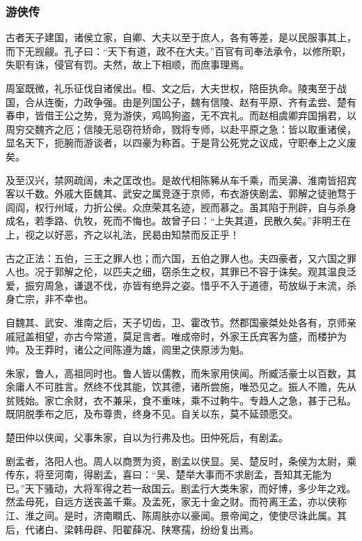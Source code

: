 \documentclass[]{article}
\begin{document}
\hypertarget{header-n6087}{%
\subsubsection{游侠传}\label{header-n6087}}

古者天子建国，诸侯立家，自卿、大夫以至于庶人，各有等差，是以民服事其上，而下无觊觎。孔子曰：``天下有道，政不在大夫。''百官有司奉法承令，以修所职，失职有诛，侵官有罚。夫然，故上下相顺，而庶事理焉。

周室既微，礼乐征伐自诸侯出。桓、文之后，大夫世权，陪臣执命。陵夷至于战国，合从连衡，力政争强。由是列国公子，魏有信陵、赵有平原、齐有孟尝、楚有春申，皆借王公之势，竞为游侠，鸡鸣狗盗，无不宾礼。而赵相虞卿弃国捐君，以周穷交魏齐之厄；信陵无忌窃符矫命，戮将专师，以赴平原之急：皆以取重诸侯，显名天下，扼腕而游谈者，以四豪为称首。于是背公死党之议成，守职奉上之义废矣。

及至汉兴，禁网疏阔，未之匡改也。是故代相陈豨从车千乘，而吴濞、淮南皆招宾客以千数。外戚大臣魏其、武安之属竞逐于京师，布衣游侠剧孟、郭解之徒驰骛于闾阎，权行州域，力折公侯。众庶荣其名迹，觊而慕之。虽其陷于刑辟，自与杀身成名，若季路、仇牧，死而不悔也。故曾子曰：``上失其道，民散久矣。''非明王在上，视之以好恶，齐之以礼法，民曷由知禁而反正乎！

古之正法：五伯，三王之罪人也；而六国，五伯之罪人也。夫四豪者，又六国之罪人也。况于郭解之伦，以匹夫之细，窃杀生之权，其罪已不容于诛矣。观其温良泛爱，振穷周急，谦退不伐，亦皆有绝异之姿。惜乎不入于道德，苟放纵于末流，杀身亡宗，非不幸也。

自魏其、武安、淮南之后，天子切齿，卫、霍改节。然郡国豪桀处处各有，京师亲戚冠盖相望，亦古今常道，莫足言者。唯成帝时，外家王氏宾客为盛，而楼护为帅。及王莽时，诸公之间陈遵为雄，闾里之侠原涉为魁。

朱家，鲁人，高祖同时也。鲁人皆以儒教，而朱家用侠闻。所臧活豪士以百数，其余庸人不可胜言。然终不伐其能，饮其德，诸所尝施，唯恐见之。振人不赡，先从贫贱始。家亡余财，衣不兼采，食不重味，乘不过軥牛。专趋人之急，甚于己私。既阴脱季布之厄，及布尊贵，终身不见。自关以东，莫不延颈愿交。

楚田仲以侠闻，父事朱家，自以为行弗及也。田仲死后，有剧孟。

剧孟者，洛阳人也。周人以商贾为资，剧孟以侠显。吴、楚反时，条侯为太尉，乘传东，将至河南，得剧孟，喜曰：``吴、楚举大事而不求剧孟，吾知其无能为已。''天下骚动，大将军得之若一敌国云。剧孟行大类朱家，而好博，多少年之戏。然孟母死，自远方送丧盖千乘。及孟死，家无十金之财。而符离王孟，亦以侠称江、淮之间。是时，济南瞷氏、陈周肤亦以豪闻。景帝闻之，使使尽诛此属。其后，代诸白、梁韩毋辟、阳翟薛况、陕寒孺，纷纷复出焉。
\end{document}
